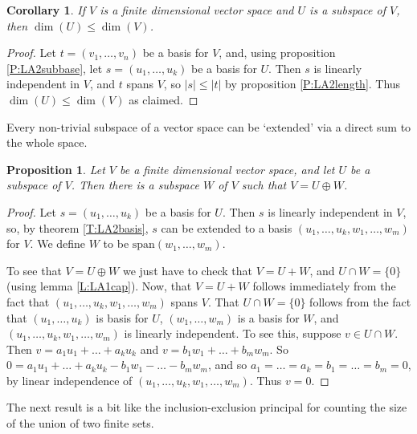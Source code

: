 \documentclass{article}
\theoremstyle{plain}
\newtheorem{proposition}[theorem]{Proposition}{\bfseries}{\itshape}
\newtheorem{corollary}[theorem]{Corollary}{\bfseries}{\upshape}
\newcommand{\spa}{\mathrm{span}}
\begin{document}
\begin{corollary}
If $V$ is a finite dimensional vector space and $U$ is a subspace of $V$, then $\dim(U)\leq \dim(V)$.
\end{corollary}
\begin{proof}
Let $t= (v_1,\ldots,v_n)$ be a basis for $V$, and, using proposition \ref{P:LA2subbase}, let $s= (u_1,\ldots,u_k)$ be a basis for $U$. Then $s$ is linearly independent in $V$, and $t$ spans $V$, so $|s|\leq |t|$ by proposition \ref{P:LA2length}. Thus $\dim(U)\leq \dim(V)$ as claimed.
\end{proof}

Every non-trivial subspace of a vector space can be `extended' via a direct sum to the whole space.
\begin{proposition}
Let $V$ be a finite dimensional vector space, and let $U$ be a subspace of $V$. Then there is a subspace $W$ of $V$ such that $V=U\oplus W$.
\end{proposition}
\begin{proof}
Let $s=(u_1,\ldots,u_k)$ be a basis for $U$. Then $s$ is linearly independent in $V$, so, by theorem \ref{T:LA2basis}, $s$ can be extended to a basis $(u_1,\ldots,u_k,w_1,\ldots,w_m)$ for $V$. We define $W$ to be $\spa(w_1,\ldots,w_m)$.

To see that $V = U\oplus W$ we just have to check that $V = U + W$, and $U\cap W =\{0\}$ (using lemma \ref{L:LA1cap}). Now, that $V = U + W$ follows immediately from the fact that $(u_1,\ldots,u_k,w_1,\ldots,w_m)$ spans $V$. That $U\cap W =\{0\}$ follows from the fact that $(u_1,\ldots,u_k)$ is basis for $U$, $(w_1,\ldots,w_m)$ is a basis for $W$, and $(u_1,\ldots,u_k,w_1,\ldots,w_m)$ is linearly independent. To see this, suppose $v\in U\cap W$. Then $v = a_1u_1+\ldots + a_ku_k$ and $v = b_1w_1+\ldots + b_mw_m$. So $0 = a_1u_1+\ldots + a_ku_k - b_1w_1-\ldots - b_mw_m$, and so $a_1=\ldots = a_k=b_1=\ldots = b_m = 0$, by linear independence of $(u_1,\ldots,u_k,w_1,\ldots,w_m)$. Thus $v = 0$.  
\end{proof}

The next result is a bit like the inclusion-exclusion principal for counting the size of the union of two finite sets.
\end{document}
